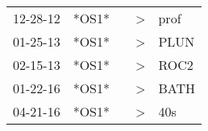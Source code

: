 \begin{supertabular}{p{0.07\textwidth}p{0.06\textwidth}p{0.02\textwidth}p{0.02\textwidth}p{0.06\textwidth}}
 12-28-12\textsuperscript{} &  *OS1* &   &  \textgreater &  prof\textsuperscript{} \\
 01-25-13\textsuperscript{} &  *OS1* &   &  \textgreater &  PLUN\textsuperscript{} \\
 02-15-13\textsuperscript{} &  *OS1* &   &  \textgreater &  ROC2\textsuperscript{} \\
 01-22-16\textsuperscript{} &  *OS1* &   &  \textgreater &  BATH\textsuperscript{} \\
 04-21-16\textsuperscript{} &  *OS1* &   &  \textgreater &   40s\textsuperscript{} \\
\end{supertabular}
